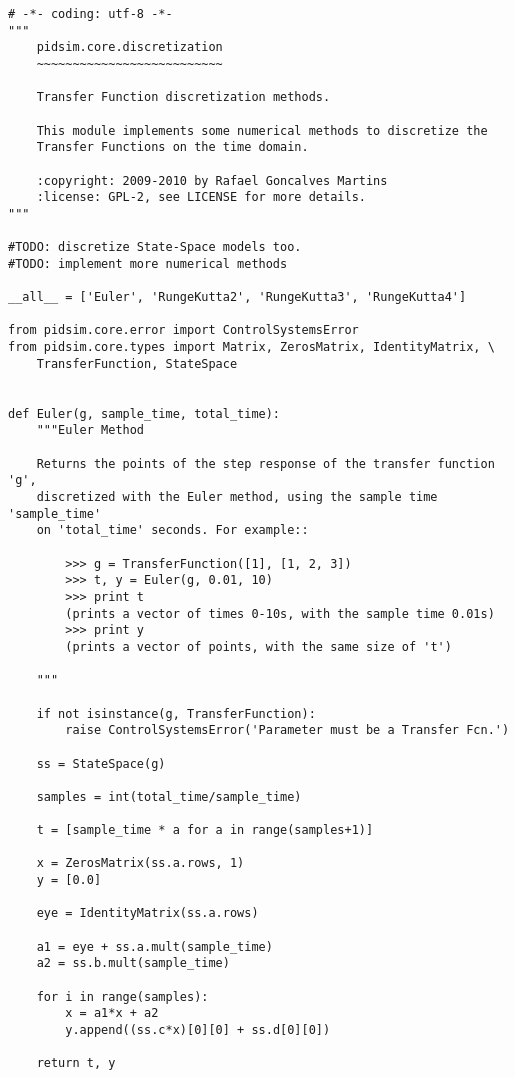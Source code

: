     \begin{verbatim}
# -*- coding: utf-8 -*-
"""
    pidsim.core.discretization
    ~~~~~~~~~~~~~~~~~~~~~~~~~~

    Transfer Function discretization methods.
    
    This module implements some numerical methods to discretize the
    Transfer Functions on the time domain.
    
    :copyright: 2009-2010 by Rafael Goncalves Martins
    :license: GPL-2, see LICENSE for more details.
"""

#TODO: discretize State-Space models too.
#TODO: implement more numerical methods

__all__ = ['Euler', 'RungeKutta2', 'RungeKutta3', 'RungeKutta4']

from pidsim.core.error import ControlSystemsError
from pidsim.core.types import Matrix, ZerosMatrix, IdentityMatrix, \
    TransferFunction, StateSpace


def Euler(g, sample_time, total_time):
    """Euler Method
    
    Returns the points of the step response of the transfer function 'g',
    discretized with the Euler method, using the sample time 'sample_time'
    on 'total_time' seconds. For example::
    
        >>> g = TransferFunction([1], [1, 2, 3])
        >>> t, y = Euler(g, 0.01, 10)
        >>> print t
        (prints a vector of times 0-10s, with the sample time 0.01s)
        >>> print y
        (prints a vector of points, with the same size of 't')
    
    """
    
    if not isinstance(g, TransferFunction):
        raise ControlSystemsError('Parameter must be a Transfer Fcn.')

    ss = StateSpace(g)
    
    samples = int(total_time/sample_time)
    
    t = [sample_time * a for a in range(samples+1)]
    
    x = ZerosMatrix(ss.a.rows, 1)
    y = [0.0]
    
    eye = IdentityMatrix(ss.a.rows)
    
    a1 = eye + ss.a.mult(sample_time)
    a2 = ss.b.mult(sample_time)
    
    for i in range(samples):
        x = a1*x + a2
        y.append((ss.c*x)[0][0] + ss.d[0][0])

    return t, y



\end{verbatim}
